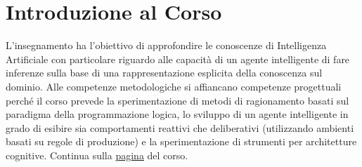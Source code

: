 \section{Introduzione al Corso}
L'insegnamento ha l’obiettivo di approfondire le conoscenze di Intelligenza Artificiale con particolare riguardo alle capacità di un agente intelligente di fare inferenze sulla base di una rappresentazione esplicita della conoscenza sul dominio. Alle competenze metodologiche si affiancano competenze progettuali perché il corso prevede la sperimentazione di metodi di ragionamento basati sul paradigma della programmazione logica, lo sviluppo di un agente intelligente in grado di esibire sia comportamenti reattivi che deliberativi (utilizzando ambienti basati su regole di produzione) e la sperimentazione di strumenti per architetture cognitive. Continua sulla \href{http://magistrale.educ.di.unito.it/index.php/offerta-formativa/insegnamenti/laurea-magistrale/insegnamenti-laurea-magistrale/scheda-insegnamento?cod=MFN0942&codA=&year=2022&orienta=YXHO}{pagina} del corso.